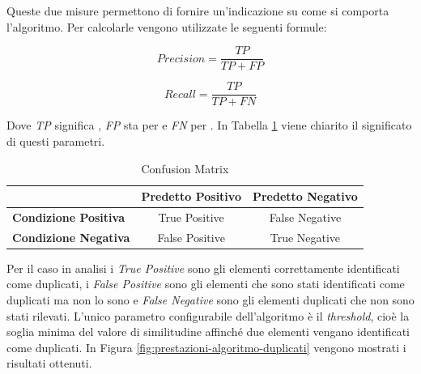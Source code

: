 Queste due misure permettono di fornire un'indicazione su come si comporta l'algoritmo. Per calcolarle vengono utilizzate le seguenti formule:

\begin{center}
	\begin{minipage}[t]{0.5\textwidth}
		\begin{equation*}
		Precision = \frac{TP}{TP + FP}
		\end{equation*}
	\end{minipage}%
	\begin{minipage}[t]{0.5\textwidth}
		\begin{equation*}
		Recall = \frac{TP}{TP + FN}
		\end{equation*}
	\end{minipage}
\end{center}

Dove \emph{TP} significa , \emph{FP} sta per  e \emph{FN} per . In Tabella \ref{table:confusion-matrix} viene chiarito il significato di questi parametri.

\begin{table}[ht]
	\caption{Confusion Matrix}
	\label{table:confusion-matrix}
	\begin{tabularx}{\textwidth}{l | cc}
		\toprule
		& \textbf{Predetto Positivo} & \textbf{Predetto Negativo} \\
		\midrule
		\textbf{Condizione Positiva} & True Positive & False Negative  \\
		\hline
		\textbf{Condizione Negativa} & False Positive & True Negative \\
		\bottomrule
	\end{tabularx}
\end{table}

Per il caso in analisi i \emph{True Positive} sono gli elementi correttamente identificati come duplicati, i \emph{False Positive} sono gli elementi che sono stati identificati come duplicati ma non lo sono e \emph{False Negative} sono gli elementi duplicati che non sono stati rilevati. L'unico parametro configurabile dell'algoritmo è il \emph{threshold}, cioè la soglia minima del valore di similitudine affinché due elementi vengano identificati come duplicati. In Figura \ref{fig:prestazioni-algoritmo-duplicati} vengono mostrati i risultati ottenuti.

